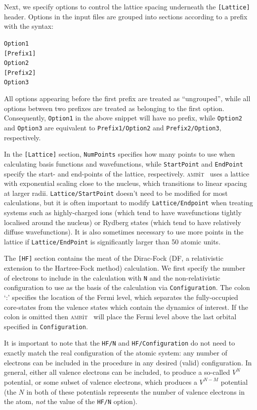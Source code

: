 \documentclass{report}
\newcommand{\ambit}{\textsc{amb}{\footnotesize i}\textsc{t}}
\begin{document}
Next, we specify options to control the lattice spacing underneath the \texttt{[Lattice]} header. 
Options in the input files are grouped into sections according to a prefix with the
syntax:

\texttt{Option1}\\
\texttt{[Prefix1]}\\
\texttt{Option2}\\
\texttt{[Prefix2]}\\
\texttt{Option3}

All options appearing before the first prefix are treated as ``ungrouped'', while all options between
two prefixes are treated as belonging to the first option. Consequently, \texttt{Option1} in the above
snippet will have no prefix, while \texttt{Option2} and \texttt{Option3} are equivalent to
\texttt{Prefix1/Option2} and \texttt{Prefix2/Option3}, respectively.

In the \texttt{[Lattice]} section, \texttt{NumPoints} specifies how many points to use when calculating
basis functions and wavefunctions, while \texttt{StartPoint} and \texttt{EndPoint} specify the start-
and end-points of the lattice, respectively. \ambit~ uses a lattice with exponential scaling close to
the nucleus, which transitions to linear spacing at larger radii. \texttt{Lattice/StartPoint} doesn't
need to be modified for most calculations, but it is often important to modify \texttt{Lattice/Endpoint}
when treating systems such as highly-charged ions (which tend to have wavefunctions tightly localised
around the nucleus) or Rydberg states (which tend to have relatively diffuse wavefunctions). It is also
sometimes necessary to use more points in the lattice if \texttt{Lattice/EndPoint} is significantly
larger than 50 atomic units.

The \texttt{[HF]} section contains the meat of the Dirac-Fock (DF, a relativistic extension to the
Hartree-Fock method) calculation. We first specify the number of electrons to include in the calculation
with \texttt{N} and the non-relativistic configuration to use as the basis of the calculation via
\texttt{Configuration}. The colon `:' specifies the location of the Fermi level, which separates the
fully-occupied core-states from the valence states which contain the dynamics of interest. If the colon
is omitted then \ambit~ will place the Fermi level above the last orbital specified in
\texttt{Configuration}.

It is important to note that the \texttt{HF/N} and \texttt{HF/Configuration} do not need to exactly
match the real configuration of the atomic system: any number of electrons can be included in the 
procedure in any desired (valid) configuration. In general, either all valence electrons can be
included, to produce a so-called $V^N$ potential, or some subset of valence electrons, which produces a
$V^{N-M}$ potential (the $N$ in both of these potentials represents the number of valence electrons in 
the atom, \emph{not} the value of the \texttt{HF/N} option).
\end{document}
